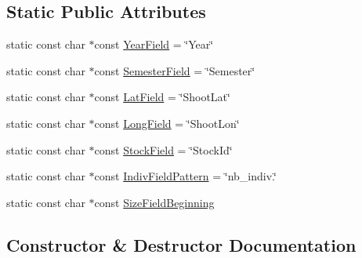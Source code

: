 \subsection*{Static Public Attributes}
\begin{DoxyCompactItemize}
\item 
static const char $\ast$const \mbox{\hyperlink{classdisplace_1_1workers_1_1_population_distribution_data_merger_strategy_a37c7981669f8d80aca2753b2ea4e2937}{Year\+Field}} = \char`\"{}Year\char`\"{}
\item 
static const char $\ast$const \mbox{\hyperlink{classdisplace_1_1workers_1_1_population_distribution_data_merger_strategy_ad2891462147b8c60d9acbc29927eec4c}{Semester\+Field}} = \char`\"{}Semester\char`\"{}
\item 
static const char $\ast$const \mbox{\hyperlink{classdisplace_1_1workers_1_1_population_distribution_data_merger_strategy_a581d7fa0714a75e0242c2388580c86d7}{Lat\+Field}} = \char`\"{}Shoot\+Lat\char`\"{}
\item 
static const char $\ast$const \mbox{\hyperlink{classdisplace_1_1workers_1_1_population_distribution_data_merger_strategy_a347da574cc40a787ae4d6298d872bce3}{Long\+Field}} = \char`\"{}Shoot\+Lon\char`\"{}
\item 
static const char $\ast$const \mbox{\hyperlink{classdisplace_1_1workers_1_1_population_distribution_data_merger_strategy_a10f1aed9f287d21b82aa9d954a94173c}{Stock\+Field}} = \char`\"{}Stock\+Id\char`\"{}
\item 
static const char $\ast$const \mbox{\hyperlink{classdisplace_1_1workers_1_1_population_distribution_data_merger_strategy_a1334a0f21e71b4c9a4054ec481cadfda}{Indiv\+Field\+Pattern}} = \char`\"{}nb\+\_\+indiv.\char`\"{}
\item 
static const char $\ast$const \mbox{\hyperlink{classdisplace_1_1workers_1_1_population_distribution_data_merger_strategy_a805acac19607dc1d29bfed9874ae44dd}{Size\+Field\+Beginning}}
\end{DoxyCompactItemize}


\subsection{Constructor \& Destructor Documentation}
\mbox{\label{classdisplace_1_1workers_1_1_population_distribution_data_merger_strategy_a4351887c2f02288ce8d6ac878e96256b}} 
